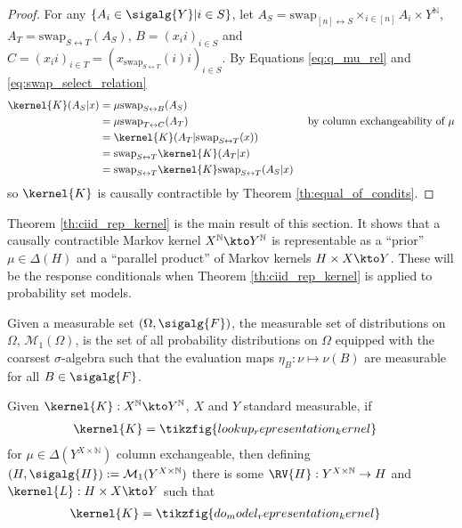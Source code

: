 \begin{proof}
For any $\{A_i\in\sigalg{Y}|i\in S\}$, let $A_S = \text{swap}_{[n]\leftrightarrow S} \times_{i\in [n]} A_i\times Y^{\mathbb{N}}$, $A_T = \text{swap}_{S\leftrightarrow T} (A_S)$, $B=(x_i i)_{i\in S}$ and $C=(x_i i)_{i\in T}=(x_{\text{swap}_{S\leftrightarrow T}}(i) i)_{i\in S}$. By Equations \ref{eq:q_mu_rel} and \ref{eq:swap_select_relation}
\begin{align}
    \kernel{K}(A_S|x) &= \mu \text{swap}_{S\leftrightarrow B} (A_S)\\
    &= \mu \text{swap}_{T\leftrightarrow C} (A_T)&\text{ by column exchangeability of }\mu\\
    &= \kernel{K}(A_T|\text{swap}_{S\leftrightarrow T}(x))\\
    &=  \text{swap}_{S\leftrightarrow T}\kernel{K}(A_T| x)\\
    &= \text{swap}_{S\leftrightarrow T} \kernel{K} \text{swap}_{S\leftrightarrow T} (A_S| x)
\end{align}
so $\kernel{K}$ is causally contractible by Theorem \ref{th:equal_of_condits}.
\end{proof}

Theorem \ref{th:ciid_rep_kernel} is the main result of this section. It shows that a causally contractible Markov kernel $X^{\mathbb{N}}\kto Y^{\mathbb{N}}$ is representable as a ``prior'' $\mu\in \Delta(H)$ and a ``parallel product'' of Markov kernels $H\times X\kto Y$. These will be the response conditionals when Theorem \ref{th:ciid_rep_kernel} is applied to probability set models.

\begin{definition}
Given a measurable set $(\Omega,\sigalg{F})$, the measurable set of distributions on $\Omega$, $\mathcal{M}_1(\Omega)$, is the set of all probability distributions on $\Omega$ equipped with the coarsest $\sigma$-algebra such that the evaluation maps $\eta_B:\nu\mapsto \nu(B)$ are measurable for all $B\in \sigalg{F}$.
\end{definition}

\begin{lemma}\label{lem:extabl_to_respf}
Given $\kernel{K}:X^{\mathbb{N}}\kto Y^{\mathbb{N}}$, $X$ and $Y$ standard measurable, if
\begin{align}
    \kernel{K} &= \tikzfig{lookup_representation_kernel}
\end{align}
for $\mu\in \Delta(Y^{X\times\mathbb{N}})$ column exchangeable, then defining $(H,\sigalg{H}):=\mathcal{M}_1(Y^{X\times\mathbb{N}})$ there is some $\RV{H}:Y^{X\times\mathbb{N}}\to H$ and $\kernel{L}:H\times X\kto Y$ such that
\begin{align}
    \kernel{K} &= \tikzfig{do_model_representation_kernel}
\end{align}
\end{lemma}

